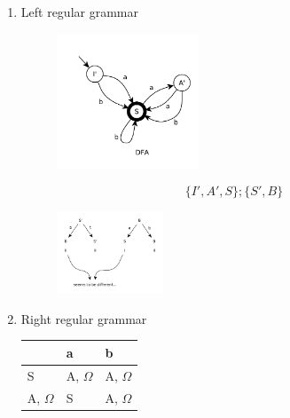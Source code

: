 \begin{enumerate}
    \item
    Left regular grammar
    \begin{figure}[H]
        \centerline{\includegraphics[width=0.4\textwidth]{img/44.pdf}}
    \end{figure}
    $$
        \{I', A', S\}; \{S', B\}
    $$
    \begin{figure}[H]
        \centerline{\includegraphics[width=0.3\textwidth]{img/45.pdf}}
    \end{figure}
    \item
    Right regular grammar
    \begin{table}[H]
        \centering
        \begin{tabular}{l|l|l}
            & a & b \\ \hline
            S & A, $\Omega$ & A, $\Omega$ \\ \hline
            A, $\Omega$ & S & A, $\Omega$ \\
        \end{tabular}
    \end{table}
\end{enumerate}


